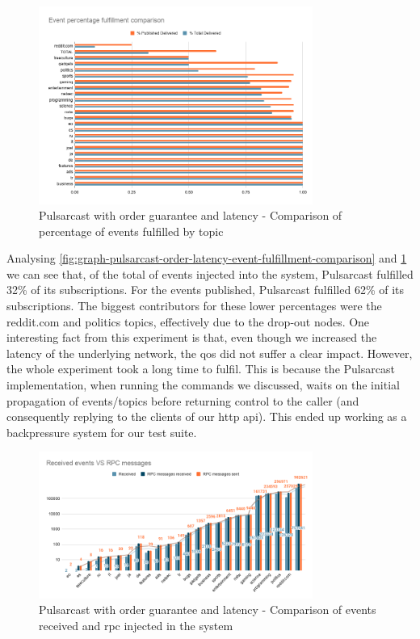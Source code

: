 \begin{figure}[!htb]
  \centering
  \includegraphics[width=0.8\textwidth]{img/graph-pulsarcast-order-latency-event-percentage-fulfillment-comparison.png}
  \caption{Pulsarcast with order guarantee and latency - Comparison of percentage of events fulfilled by topic}
  \label{fig:graph-pulsarcast-order-latency-event-percentage-fulfillment-comparison}
\end{figure}

Analysing \ref{fig:graph-pulsarcast-order-latency-event-fulfillment-comparison}
and
\ref{fig:graph-pulsarcast-order-latency-event-percentage-fulfillment-comparison}
we can see that, of the total of events injected into the system, Pulsarcast
fulfilled 32\% of its subscriptions. For the events published, Pulsarcast
fulfilled 62\% of its subscriptions. The biggest contributors for these lower
percentages were the reddit.com and politics topics, effectively due to the
drop-out nodes. One interesting fact from this experiment is that, even though
we increased the latency of the underlying network, the \acrshort{qos} did not
suffer a clear impact.  However, the whole experiment took a long time to
fulfil. This is because the Pulsarcast implementation, when running the
commands we discussed, waits on the initial propagation of events/topics before
returning control to the caller (and consequently replying to the clients of
our \acrshort{http} \acrshort{api}). This ended up working as a backpressure
system for our test suite.

\begin{figure}[!htb]
  \centering
  \includegraphics[width=0.8\textwidth]{img/graph-pulsarcast-order-latency-rpc.png}
  \caption{Pulsarcast with order guarantee and latency - Comparison of events received and \acrshort{rpc} injected in the system}
  \label{fig:graph-pulsarcast-order-latency-rpc}
\end{figure}


